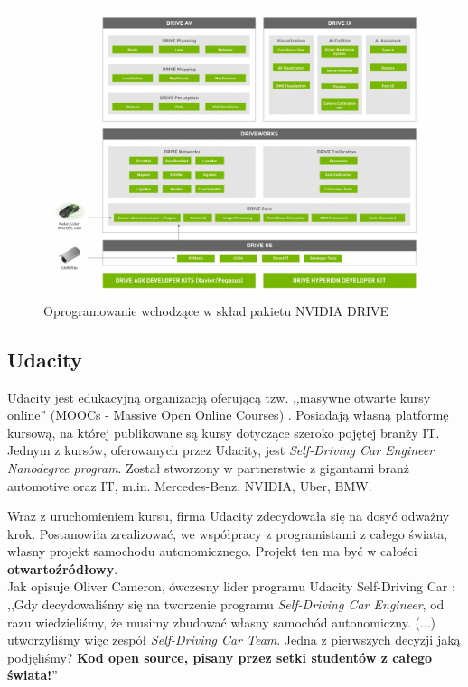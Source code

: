 \begin{figure}[h]
\begin{center}
\includegraphics[width=15cm]{resources/figures/nvidia-drive-software-stack.jpg}
\caption{Oprogramowanie wchodzące w skład pakietu NVIDIA DRIVE}
\label{NvidiaDriveSoftwareStack}
\end{center}
\end{figure}

\subsection{Udacity}
Udacity jest edukacyjną organizacją oferującą tzw. ,,masywne otwarte kursy online'' (MOOCs - Massive Open Online Courses) \cite{mooc:guide}. Posiadają własną platformę kursową, na której publikowane są kursy dotyczące szeroko pojętej branży IT. \\
Jednym z kursów, oferowanych przez Udacity, jest \textit{Self-Driving Car Engineer Nanodegree program}. Został stworzony w partnerstwie z gigantami branż automotive oraz IT, m.in. Mercedes-Benz, NVIDIA, Uber, BMW.

Wraz z uruchomieniem kursu, firma Udacity zdecydowała się na dosyć odważny krok. Postanowiła zrealizować, we współpracy z programistami z całego świata, własny projekt samochodu autonomicznego. Projekt ten ma być w całości \textbf{otwartoźródłowy}. \\
Jak opisuje Oliver Cameron, ówczesny lider programu Udacity Self-Driving Car \cite{udacity:selfDrivingCar}: \\
,,Gdy decydowaliśmy się na tworzenie programu  \textit{Self-Driving Car Engineer}, od razu wiedzieliśmy, że musimy zbudować własny samochód autonomiczny. (...) utworzyliśmy więc zespół \textit{Self-Driving Car Team}. Jedna z pierwszych decyzji jaką podjęliśmy? \textbf{Kod open source, pisany przez setki studentów z całego świata!}''

